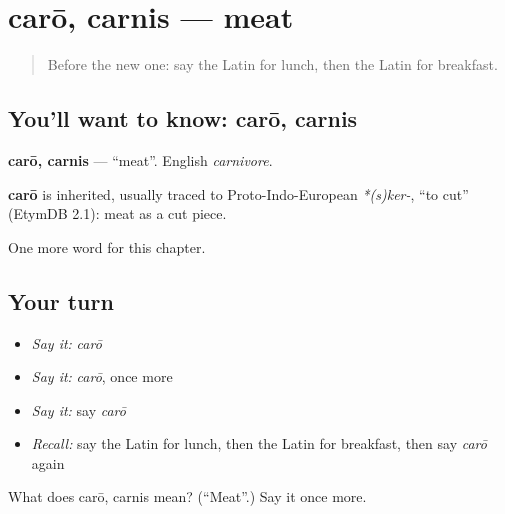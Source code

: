 \section[carō, carnis]{carō, carnis — meat}

\label{lesson:LA-C79-caro}



\begin{quote}
Before the new one: say the Latin for lunch, then the Latin for breakfast.
\end{quote}

\subsection*{You'll want to know: carō, carnis}
\textbf{carō, carnis} — \textquotedblleft{}meat\textquotedblright{}. English \emph{carnivore}.

\begin{cousinweb}
\textbf{carō} is inherited, usually traced to Proto-Indo-European \emph{*(s)ker-}, \textquotedblleft{}to cut\textquotedblright{} (EtymDB 2.1): meat as a cut piece.
\end{cousinweb}

\begin{grammarlens}[title={What you've built}]
One more word for this chapter.
\end{grammarlens}

\subsection*{Your turn}
\begin{itemize}
\raggedright
  \item \emph{Say it:} \emph{carō}
  \item \emph{Say it:} \emph{carō}, once more
  \item \emph{Say it:} say \emph{carō}
  \item \emph{Recall:} say the Latin for lunch, then the Latin for breakfast, then say \emph{carō} again
\end{itemize}

\begin{tcolorbox}[breakable,colback=teal!4,colframe=teal!35!black,title={Before you move on}]
What does carō, carnis mean? (\textquotedblleft{}Meat\textquotedblright{}.) Say it once more.
\end{tcolorbox}
